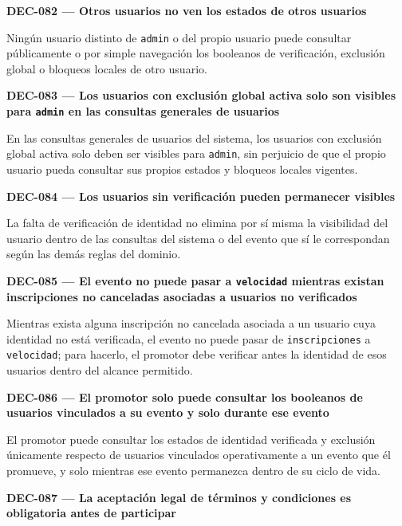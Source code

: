 \documentclass[10pt,letterpaper]{article}
\begin{document}
\noindent\textbf{DEC-082 --- Otros usuarios no ven los estados de otros usuarios}\par
Ningún usuario distinto de \texttt{admin} o del propio usuario puede consultar públicamente o por simple navegación los booleanos de verificación, exclusión global o bloqueos locales de otro usuario.\par\vspace{0.45em}
\noindent\textbf{DEC-083 --- Los usuarios con exclusión global activa solo son visibles para \texttt{admin} en las consultas generales de usuarios}\par
En las consultas generales de usuarios del sistema, los usuarios con exclusión global activa solo deben ser visibles para \texttt{admin}, sin perjuicio de que el propio usuario pueda consultar sus propios estados y bloqueos locales vigentes.\par\vspace{0.45em}
\noindent\textbf{DEC-084 --- Los usuarios sin verificación pueden permanecer visibles}\par
La falta de verificación de identidad no elimina por sí misma la visibilidad del usuario dentro de las consultas del sistema o del evento que sí le correspondan según las demás reglas del dominio.\par\vspace{0.45em}
\noindent\textbf{DEC-085 --- El evento no puede pasar a \texttt{velocidad} mientras existan inscripciones no canceladas asociadas a usuarios no verificados}\par
Mientras exista alguna inscripción no cancelada asociada a un usuario cuya identidad no está verificada, el evento no puede pasar de \texttt{inscripciones} a \texttt{velocidad}; para hacerlo, el promotor debe verificar antes la identidad de esos usuarios dentro del alcance permitido.\par\vspace{0.45em}
\noindent\textbf{DEC-086 --- El promotor solo puede consultar los booleanos de usuarios vinculados a su evento y solo durante ese evento}\par
El promotor puede consultar los estados de identidad verificada y exclusión únicamente respecto de usuarios vinculados operativamente a un evento que él promueve, y solo mientras ese evento permanezca dentro de su ciclo de vida.\par\vspace{0.45em}
\noindent\textbf{DEC-087 --- La aceptación legal de términos y condiciones es obligatoria antes de participar}\par
\end{document}
